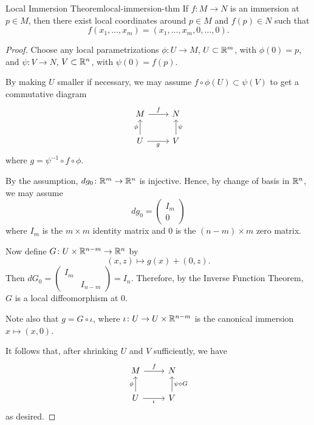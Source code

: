 \begin{theorem}{Local Immersion Theorem}{local-immersion-thm}
    If $f \colon M \to N$ is an immersion at $p \in M$, then there exist local coordinates around $p \in M$ and $f(p) \in N$ such that
    \[
        f(x_1, \ldots, x_m) = (x_1, \ldots, x_m, 0, \ldots, 0).
    \]
\end{theorem}

\begin{proof}
    Choose any local parametrizations $\phi \colon U \to M$, $U \subset \mathbb{R}^m$, with $\phi(0) = p$, and $\psi \colon V \to N$, $V \subset \mathbb{R}^n$, with $\psi(0) = f(p)$.

    By making $U$ smaller if necessary, we may assume $f \circ \phi(U) \subset \psi(V)$ to get a commutative diagram
    \[
    \begin{tikzcd}
        M \arrow[r, "f"] & N \\
        U \arrow[u, "\phi"] \arrow[r, "g"'] & V \arrow[u, "\psi"']
    \end{tikzcd}
    \]
    where $g = \psi^{-1} \circ f \circ \phi$.

    By the assumption, $dg_0 \colon \mathbb{R}^m \to \mathbb{R}^n$ is injective. Hence, by change of basis in $\mathbb{R}^n$, we may assume
    \[
        dg_0 = \begin{pmatrix} I_m \\ 0 \end{pmatrix}
    \]
    where $I_m$ is the $m \times m$ identity matrix and $0$ is the $(n-m) \times m$ zero matrix.

    Now define $G \colon U \times \mathbb{R}^{n-m} \to \mathbb{R}^n$ by
    \[
        (x, z) \mapsto g(x) + (0, z).
    \]
    Then $dG_0 = \begin{pmatrix} I_m & \\ & I_{n-m} \end{pmatrix} = I_n$. Therefore, by the Inverse Function Theorem, $G$ is a local diffeomorphism at $0$.

    Note also that $g = G \circ \iota$, where $\iota \colon U \to U \times \mathbb{R}^{n-m}$ is the canonical immersion $x \mapsto (x, 0)$.

    It follows that, after shrinking $U$ and $V$ sufficiently, we have
    \[
    \begin{tikzcd}
        M \arrow[r, "f"] & N \\
        U \arrow[u, "\phi"] \arrow[r, "\iota"'] & V \arrow[u, "\psi \circ G"']
    \end{tikzcd}
    \]
    as desired.
\end{proof}

